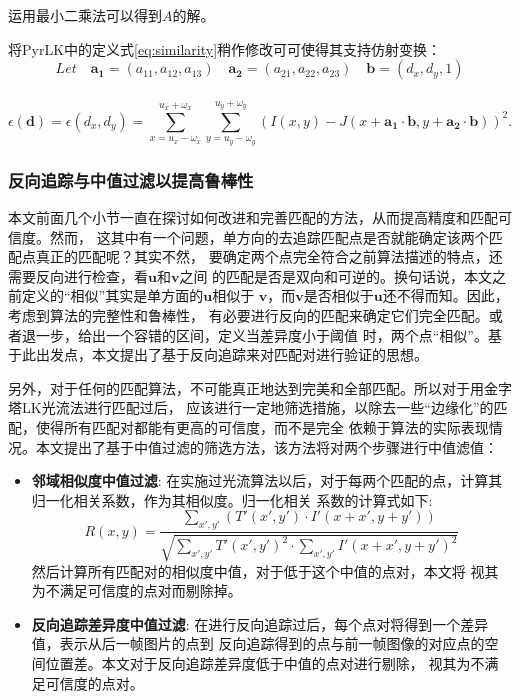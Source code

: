 运用最小二乘法可以得到$A$的解。

将PyrLK中的定义式\ref{eq:similarity}稍作修改可可使得其支持仿射变换：\\
\[ Let\quad \mathbf{a_1}=(a_{11},a_{12},a_{13})\quad \mathbf{a_2}=(a_{21},a_{22},a_{23})\quad
\mathbf{b}=(d_x,d_y,1)\]\\
\begin{equation}\label{eq:affine}
	\epsilon(\mathbf{d})=\epsilon(d_x,d_y)=\sum_{x=u_x-\omega_x}^{u_x+\omega_x}\sum_{y=u_y-\omega_y}
	^{u_y+\omega_y}(I(x,y) - J(x+\mathbf{a_1}\cdot \mathbf{b},y+\mathbf{a_2}\cdot \mathbf{b}))^2.
\end{equation}


\subsubsection{反向追踪与中值过滤以提高鲁棒性}
本文前面几个小节一直在探讨如何改进和完善匹配的方法，从而提高精度和匹配可信度。然而，
这其中有一个问题，单方向的去追踪匹配点是否就能确定该两个匹配点真正的匹配呢？其实不然，
要确定两个点完全符合之前算法描述的特点，还需要反向进行检查，看$\mathbf{u}$和$\mathbf{v}$之间
的匹配是否是双向和可逆的。换句话说，本文之前定义的“相似”其实是单方面的$\mathbf{u}$相似于
$\mathbf{v}$，而$\mathbf{v}$是否相似于$\mathbf{u}$还不得而知。因此，考虑到算法的完整性和鲁棒性，
有必要进行反向的匹配来确定它们完全匹配。或者退一步，给出一个容错的区间，定义当差异度小于阈值
时，两个点“相似”。基于此出发点，本文提出了基于反向追踪来对匹配对进行验证的思想。

另外，对于任何的匹配算法，不可能真正地达到完美和全部匹配。所以对于用金字塔LK光流法进行匹配过后，
应该进行一定地筛选措施，以除去一些“边缘化”的匹配，使得所有匹配对都能有更高的可信度，而不是完全
依赖于算法的实际表现情况。本文提出了基于中值过滤的筛选方法，该方法将对两个步骤进行中值滤值：\\
\begin{itemize}
	\item \textbf{邻域相似度中值过滤}: 在实施过光流算法以后，对于每两个匹配的点，计算其归一化相关系数，作为其相似度。归一化相关
		系数的计算式如下:
		\begin{equation} \label{eq:ccoeff}
			R(x,y) = \frac{\sum_{x',y'}(T'(x',y')\cdot I'(x + x', y + y'))}
			{\sqrt{\sum_{x', y'}T'(x',y')^2\cdot \sum_{x',y'}I'(x+x',y+y')^2}}
		\end{equation}
		然后计算所有匹配对的相似度中值，对于低于这个中值的点对，本文将
		视其为不满足可信度的点对而剔除掉。
	\item \textbf{反向追踪差异度中值过滤}: 在进行反向追踪过后，每个点对将得到一个差异值，表示从后一帧图片的点到
		反向追踪得到的点与前一帧图像的对应点的空间位置差。本文对于反向追踪差异度低于中值的点对进行剔除，
		视其为不满足可信度的点对。
\end{itemize}

